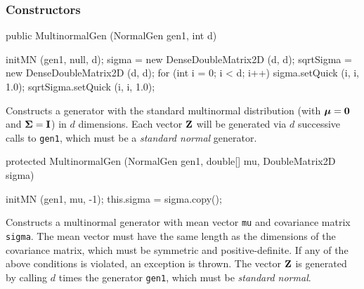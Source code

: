\subsubsection* {Constructors}
\begin{code}

   public MultinormalGen (NormalGen gen1, int d)\begin{hide} {
      initMN (gen1, null, d);
      sigma = new DenseDoubleMatrix2D (d, d);
      sqrtSigma = new DenseDoubleMatrix2D (d, d);
      for (int i = 0; i < d; i++) {
         sigma.setQuick (i, i, 1.0);
         sqrtSigma.setQuick (i, i, 1.0);
      }
   }\end{hide}
\end{code}
\begin{tabb} Constructs a generator with the standard multinormal distribution
  (with $\boldsymbol{\mu}=\textbf{0}$ and $\boldsymbol{\Sigma} = \textbf{I}$) in $d$ dimensions.
  Each vector $\textbf{Z}$ will be generated via $d$ successive calls to
  \texttt{gen1}, which must be a \emph{standard normal} generator.
\end{tabb}
\begin{htmlonly}
\end{htmlonly}
\begin{code}

   protected MultinormalGen (NormalGen gen1, double[] mu,
                             DoubleMatrix2D sigma)\begin{hide} {
      initMN (gen1, mu, -1);
      this.sigma = sigma.copy();
   }\end{hide}
\end{code}
\begin{tabb}   Constructs a multinormal generator with mean vector
 \texttt{mu} and covariance matrix \texttt{sigma}.
 The mean vector must have the same length as the dimensions
 of the covariance matrix, which must be symmetric and positive-definite.
 If any of the above conditions is violated, an exception is thrown.
 The vector $\textbf{Z}$ is generated by calling $d$ times the generator \texttt{gen1},
 which must be \emph{standard normal}.
\end{tabb}
\begin{htmlonly}
\end{htmlonly}
